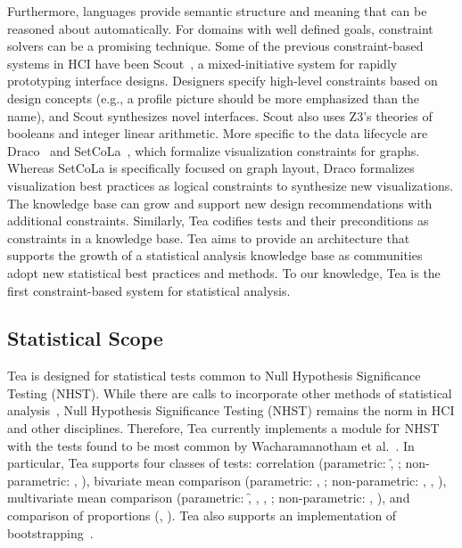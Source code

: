 Furthermore, languages provide semantic structure and meaning that can be
reasoned about automatically. For domains with well defined goals, constraint
solvers can be a promising technique. Some of the previous constraint-based
systems in HCI have been Scout~\cite{swearngin2018scout}, a mixed-initiative
system for rapidly prototyping interface designs. Designers specify high-level
constraints based on design concepts (e.g., a profile picture should be more
emphasized than the name), and Scout synthesizes novel interfaces. Scout also
uses Z3's theories of booleans and integer linear arithmetic. More specific to
the data lifecycle are Draco~\cite{moritz2019formalizing} and
SetCoLa~\cite{hoffswell2018setcola}, which formalize visualization constraints
for graphs. Whereas SetCoLa is specifically focused on graph layout, Draco
formalizes visualization best practices as logical constraints to synthesize new
visualizations. The knowledge base can grow and support new design
recommendations with additional constraints. Similarly, Tea codifies tests and
their preconditions as constraints in a knowledge base. Tea aims to provide an
architecture that supports the growth of a statistical analysis knowledge base
as communities adopt new statistical best practices and methods. To our
knowledge, Tea is the first constraint-based system for statistical analysis. 


\subsection{Statistical Scope}
Tea is designed for statistical tests common to Null Hypothesis Significance
Testing (NHST). While there are calls to incorporate other methods of
statistical analysis~\cite{kay2016researcher,kaptein2012rethinking}, Null
Hypothesis Significance Testing (NHST) remains the norm in HCI and other
disciplines. Therefore, Tea currently implements a module for NHST with the
tests found to be most common by Wacharamanotham et
al.~\cite{wacharamanotham2015statsplorer}. In particular, Tea supports four
classes of tests: correlation (parametric: \r, \pb; non-parametric: \ktau,
\srho), bivariate mean comparison (parametric: \student, \paired;
non-parametric: \mannu, \wilcox, \welch), multivariate mean comparison
(parametric: \f, \rm, \facANOVA, \twoANOVA; non-parametric: \kw, \friedman), and
comparison of proportions (\chiSq, \fisher). Tea also supports an implementation
of bootstrapping~\cite{efron1992bootstrap}.